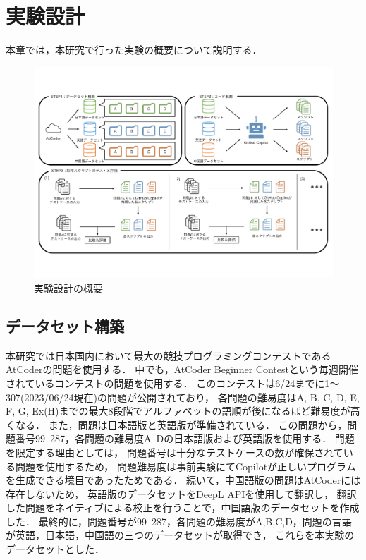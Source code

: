 \section{実験設計\label{approach}}
  本章では，本研究で行った実験の概要について説明する．
  \begin{figure}[t]
    \centering
    \includegraphics[width=\linewidth]{image/system.pdf}
    \caption{実験設計の概要}
    \label{experiment_design}
  \end{figure}
  
  \subsection{データセット構築\label{build_dataset}}
    本研究では日本国内において最大の競技プログラミングコンテストであるAtCoderの問題を使用する．
    中でも，AtCoder Beginner Contestという毎週開催されているコンテストの問題を使用する．
    このコンテストは6/24までに1〜307(2023/06/24現在)の問題が公開されており，
    各問題の難易度はA, B, C, D, E, F, G, Ex(H)までの最大8段階でアルファベットの語順が後になるほど難易度が高くなる．
    また，問題は日本語版と英語版が準備されている．
    この問題から，問題番号99~287，各問題の難易度A~Dの日本語版および英語版を使用する．
    問題を限定する理由としては，
    問題番号は十分なテストケースの数が確保されている問題を使用するため，
    問題難易度は事前実験にてCopilotが正しいプログラムを生成できる境目であったためである．
    続いて，中国語版の問題はAtCoderには存在しないため，
    英語版のデータセットをDeepL APIを使用して翻訳し，
    翻訳した問題をネイティブによる校正を行うことで，中国語版のデータセットを作成した．
    最終的に，問題番号が99~287，各問題の難易度がA,B,C,D，問題の言語が英語，日本語，中国語の三つのデータセットが取得でき，
    これらを本実験のデータセットとした．

